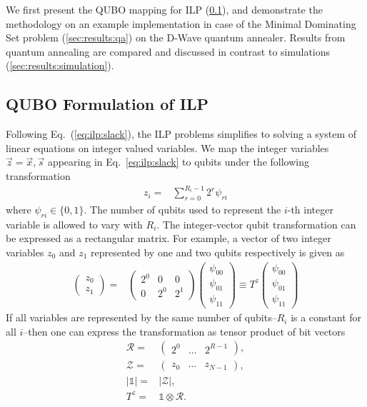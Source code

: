 \documentclass[prd,twocolumn,tightenlines,preprintnumbers,showpacs,superscriptaddress,notitlepage,nofootinbib,eqsecnum,floatfix,longbibliography,aps,10pt]{revtex4-1}
\begin{document}
We first present the QUBO mapping for ILP (\ref{sec:results:qa1}), and demonstrate the methodology on an example implementation in case of the Minimal Dominating Set problem (\ref{sec:results:qa}) on the D-Wave quantum annealer. Results from quantum annealing are compared and discussed in contrast to simulations (\ref{sec:results:simulation}).

\subsection{QUBO Formulation of ILP}
\label{sec:results:qa1}
Following Eq.~(\ref{eq:ilp:slack}), the ILP problems simplifies to solving a system of linear equations on integer valued variables. We map the integer variables $\vec z = \vec x, \vec s$ appearing in Eq.~\eqref{eq:ilp:slack} to qubits under the following transformation~\cite{Chang:2018uoc}
\begin{align}
 z_i = & \sum_{r=0}^{R_i-1} 2^r \psi_{ri}
 \label{eq:int_to_bin}
\end{align}
where $\psi_{ri} \in \{0, 1\}$. The number of qubits used to represent the $i$-th integer variable is allowed to vary with $R_i$.
The integer-vector qubit transformation can be expressed as a rectangular matrix.
For example, a vector of two integer variables $z_0$ and $z_1$ represented by one and two qubits respectively is given as
\begin{align}
 \begin{pmatrix}
  z_0 \\
  z_1
 \end{pmatrix}
 = &
 \begin{pmatrix}
  2^0 & 0   & 0   \\
  0   & 2^0 & 2^1
 \end{pmatrix}
 \begin{pmatrix}
  \psi_{00} \\
  \psi_{01} \\
  \psi_{11}
 \end{pmatrix}
 \equiv T^z \begin{pmatrix}
  \psi_{00} \\
  \psi_{01} \\
  \psi_{11}
 \end{pmatrix}
\end{align}
If all variables are represented by the same number of qubits--$R_i$ is a constant for all $i$--then one can express the transformation as tensor product of bit vectors
\begin{align}
 \mathcal{R} =  & \begin{pmatrix} 2^0 & \dots & 2^{R-1}\end{pmatrix},    \\
 \mathcal{Z} =  & \begin{pmatrix} z_0 & \dots & z_{N-1}\end{pmatrix},    \\
 |\mathds{1}| = & |\mathcal{Z}|,                 \\
 T^z =          & \mathds{1}\otimes \mathcal{R}.
\end{align}
\end{document}
